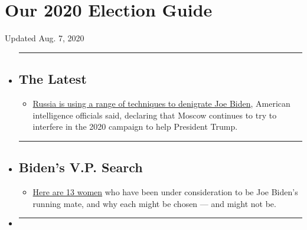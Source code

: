 \hypertarget{our-2020-election-guide}{%
\section{Our 2020 Election Guide}\label{our-2020-election-guide}}

Updated Aug. 7, 2020

\begin{itemize}
\item
  \begin{center}\rule{0.5\linewidth}{\linethickness}\end{center}

  \hypertarget{the-latest}{%
  \subsection{The Latest}\label{the-latest}}

  \begin{itemize}
  \tightlist
  \item
    \href{https://www.nytimes.com/2020/08/07/us/politics/russia-china-trump-biden-election-interference.html?action=click\&pgtype=Article\&state=default\&region=BELOW_MAIN_CONTENT\&context=storylines_guide}{Russia
    is using a range of techniques to denigrate Joe Biden}, American
    intelligence officials said, declaring that Moscow continues to try
    to interfere in the 2020 campaign to help President Trump.
  \end{itemize}
\item
  \begin{center}\rule{0.5\linewidth}{\linethickness}\end{center}

  \hypertarget{bidens-vp-search}{%
  \subsection{Biden's V.P. Search}\label{bidens-vp-search}}

  \begin{itemize}
  \tightlist
  \item
    \href{https://www.nytimes.com/article/biden-vice-president-2020.html?action=click\&pgtype=Article\&state=default\&region=BELOW_MAIN_CONTENT\&context=storylines_guide}{Here
    are 13 women} who have been under consideration to be Joe Biden's
    running mate, and why each might be chosen --- and might not be.
  \end{itemize}
\item
  \begin{center}\rule{0.5\linewidth}{\linethickness}\end{center}


\end{itemize}
